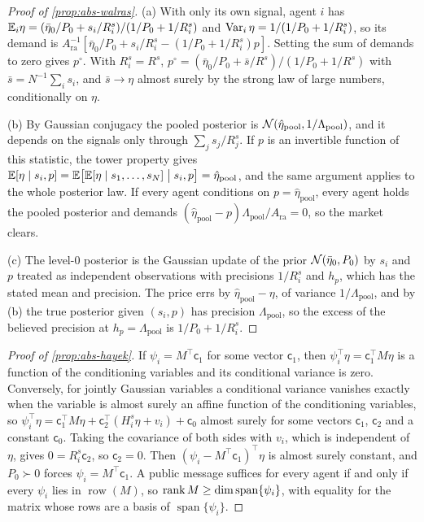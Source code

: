 \begin{proof}[Proof of \cref{prop:abs-walras}]
(a) With only its own signal, agent $i$ has $\mathbb{E}_i\eta=(\bar\eta_0/P_0+s_i/R^s_i)/(1/P_0+1/R^s_i)$ and $\operatorname{Var}_i\eta=1/(1/P_0+1/R^s_i)$, so its demand is $A_{\mathrm{ra}}^{-1}[\bar\eta_0/P_0+s_i/R^s_i-(1/P_0+1/R^s_i)p]$. Setting the sum of demands to zero gives $p^\circ$. With $R^s_i=R^s$, $p^\circ=(\bar\eta_0/P_0+\bar s/R^s)/(1/P_0+1/R^s)$ with $\bar s=N^{-1}\sum_is_i$, and $\bar s\to\eta$ almost surely by the strong law of large numbers, conditionally on $\eta$.

(b) By Gaussian conjugacy the pooled posterior is $\mathcal{N}(\hat\eta_{\mathrm{pool}},1/\Lambda_{\mathrm{pool}})$, and it depends on the signals only through $\sum_js_j/R^s_j$. If $p$ is an invertible function of this statistic, the tower property gives $\mathbb{E}[\eta\mid s_i,p]=\mathbb{E}\bigl[\mathbb{E}[\eta\mid s_1,\dots,s_N]\bigm|s_i,p\bigr]=\hat\eta_{\mathrm{pool}}$, and the same argument applies to the whole posterior law. If every agent conditions on $p=\hat\eta_{\mathrm{pool}}$, every agent holds the pooled posterior and demands $(\hat\eta_{\mathrm{pool}}-p)\Lambda_{\mathrm{pool}}/A_{\mathrm{ra}}=0$, so the market clears.

(c) The level-0 posterior is the Gaussian update of the prior $\mathcal{N}(\bar\eta_0,P_0)$ by $s_i$ and $p$ treated as independent observations with precisions $1/R^s_i$ and $h_p$, which has the stated mean and precision. The price errs by $\hat\eta_{\mathrm{pool}}-\eta$, of variance $1/\Lambda_{\mathrm{pool}}$, and by (b) the true posterior given $(s_i,p)$ has precision $\Lambda_{\mathrm{pool}}$, so the excess of the believed precision at $h_p=\Lambda_{\mathrm{pool}}$ is $1/P_0+1/R^s_i$.
\end{proof}

\begin{proof}[Proof of \cref{prop:abs-hayek}]
If $\psi_i=M^\top\mathsf c_1$ for some vector $\mathsf c_1$, then $\psi_i^\top\eta=\mathsf c_1^\top M\eta$ is a function of the conditioning variables and its conditional variance is zero. Conversely, for jointly Gaussian variables a conditional variance vanishes exactly when the variable is almost surely an affine function of the conditioning variables, so $\psi_i^\top\eta=\mathsf c_1^\top M\eta+\mathsf c_2^\top(H^s_i\eta+v_i)+\mathsf c_0$ almost surely for some vectors $\mathsf c_1$, $\mathsf c_2$ and a constant $\mathsf c_0$. Taking the covariance of both sides with $v_i$, which is independent of $\eta$, gives $0=R^s_i\mathsf c_2$, so $\mathsf c_2=0$. Then $(\psi_i-M^\top\mathsf c_1)^\top\eta$ is almost surely constant, and $P_0\succ0$ forces $\psi_i=M^\top\mathsf c_1$. A public message suffices for every agent if and only if every $\psi_i$ lies in $\operatorname{row}(M)$, so $\operatorname{rank} M\ge\dim\operatorname{span}\{\psi_i\}$, with equality for the matrix whose rows are a basis of $\operatorname{span}\{\psi_i\}$.
\end{proof}

